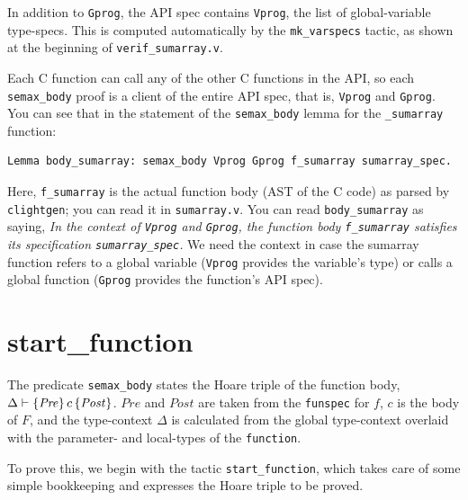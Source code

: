 \documentclass[12pt,fleqn,openany,oneside,showtrims]{memoir}
\begin{document}
In addition to \lstinline{Gprog},
the API spec contains \lstinline{Vprog}, the list of
global-variable type-specs.  This is computed automatically
by the \lstinline{mk_varspecs} tactic, as shown at the
beginning of \lstinline{verif_sumarray.v}.

Each C function can call any of the other C functions
in the API, so each \lstinline{semax_body} proof
is a client of the entire API spec, that is,
\lstinline{Vprog} and \lstinline{Gprog}.
You can see that in the statement of the
\lstinline{semax_body} lemma for the \lstinline{_sumarray}
function:
\begin{lstlisting}
Lemma body_sumarray: semax_body Vprog Gprog f_sumarray sumarray_spec.
\end{lstlisting}
Here, \lstinline{f_sumarray} is the actual function body
(AST of the C code) as parsed by \lstinline{clightgen};
you can read it in \lstinline{sumarray.v}.
You can read \lstinline{body_sumarray} as saying,
\emph{In the context of \lstinline{Vprog} and \lstinline{Gprog},
  the function body \lstinline{f_sumarray}
  satisfies its specification \lstinline{sumarray_spec}.}
We need the context in case the sumarray function
refers to a global variable (\lstinline{Vprog} provides
the variable's type)
or calls a global function
 (\lstinline{Gprog} provides
the function's API spec).

\chapter{\upshape\textsf{start\_function}}
The predicate \lstinline{semax_body}
states the Hoare triple of the function body,
$\Delta\vdash \{\mathit{Pre}\}\,c\,\{\mathit{Post}\}$.
$\mathit{Pre}$ and $\mathit{Post}$ are taken from the \lstinline{funspec}
for $f$, $c$ is the body of $F$,
and the type-context $\Delta$ is calculated from the global type-context
overlaid with the parameter- and local-types of the  \lstinline{function}.

To prove this, we begin with the tactic \lstinline{start_function},
which takes care of some simple bookkeeping and
expresses the Hoare triple to be proved.
\end{document}
